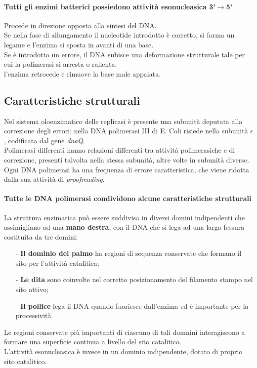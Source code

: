 \documentclass{article}
\begin{document}
\paragraph{Tutti gli enzimi batterici possiedono attività esonucleasica 3'$\rightarrow$5'} Procede in direzione opposta alla sintesi del DNA.\\
\tab Se nella fase di allungamento il nucleotide introdotto è corretto, si forma un legame e l'enzima si sposta in avanti di una base.\\
\tab Se è introdotto un errore, il DNA subisce una deformazione strutturale tale per cui la polimerasi si arresta o rallenta:\\
\tab \tab l'enzima retrocede e rimuove la base male appaiata.
\subsection{Caratteristiche strutturali} Nel sistema oloenzimatico delle replicasi è presente una subunità deputata alla correzione degli errori: nella DNA polimerasi III di E. Coli risiede nella subunità $ \epsilon $, codificata dal gene \textit{dnaQ}.\\
Polimerasi differenti hanno relazioni differenti tra attività polimerasiche e di correzione, presenti talvolta nella stessa subunità, altre volte in subunità diverse. Ogni DNA polimerasi ha una frequenza di errore caratteristica, che viene ridotta dalla sua attività di \textit{proofreading}.\\
\paragraph{Tutte le DNA polimerasi condividono alcune caratteristiche strutturali} La struttura enzimatica può essere suddivisa in diversi domini indipendenti che assimigliano ad una \textbf{mano destra}, con il DNA che si lega ad una larga fessura costituita da tre domini:
\begin{itemize}
    \item [-] \textbf{Il dominio del palmo} ha regioni di sequenza conservate che formano il sito per l'attività catalitica;
    \item [-] \textbf{Le dita} sono coinvolte nel corretto posizionamento del filamento stampo nel sito attivo;
    \item [-] \textbf{Il pollice } lega il DNA quando fuoriesce dall'enzima ed è importante per la processività.
\end{itemize}
Le regioni conservate più importanti di ciascuno di tali domnini interagiscono a formare una superficie continua a livello del sito catalitico.\\
L'attività esonucleasica è invece in un dominio indipendente, dotato di proprio sito catalitico.
\end{document}
